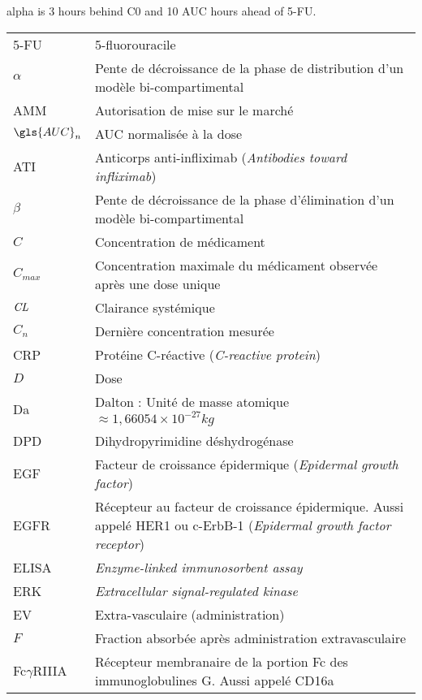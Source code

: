  
\gls{alpha} is 3 hours behind \gls{C0} and 10 \gls{AUC} hours ahead of \gls{5-FU}.
 







\begin{tabularx}{30em}{X X}
5-FU & 5-fluorouracile\\
$\alpha$ & 	Pente de décroissance de la phase de distribution d'un modèle bi-compartimental\\
AMM & 	Autorisation de mise sur le marché\\
$\gls{AUC}_n$ & 	AUC normalisée à la dose\\
ATI & 	Anticorps anti-infliximab (\textit{Antibodies toward infliximab})\\
$\beta$ & 	Pente de décroissance de la phase d'élimination d'un modèle bi-compartimental\\
$C$ & 	Concentration de médicament\\
$C_{max}$ & 	Concentration maximale du médicament observée après une dose unique\\
$\operatorname{\textit{CL}}$ & 	Clairance systémique\\
$C_n$ & 	Dernière concentration mesurée\\
CRP & 	Protéine C-réactive (\textit{C-reactive protein})\\
$D$ & 	Dose\\
Da & 	Dalton : Unité de masse atomique $\approx  1,66054\times 10^{-27} kg$\\
DPD & 	Dihydropyrimidine déshydrogénase\\
EGF & 	Facteur de croissance épidermique (\textit{Epidermal growth factor})\\
EGFR & 	Récepteur au facteur de croissance épidermique. Aussi appelé HER1 ou c-ErbB-1 (\textit{Epidermal growth factor receptor})\\
ELISA & 	\textit{Enzyme-linked immunosorbent assay}\\
ERK & 	\textit{Extracellular signal-regulated kinase}\\
EV & 	Extra-vasculaire (administration)\\
$F$ & 	Fraction absorbée après administration extravasculaire\\
Fc$\gamma$RIIIA & 	Récepteur membranaire de la portion Fc des immunoglobulines G. Aussi appelé CD16a\\

\end{tabularx}
